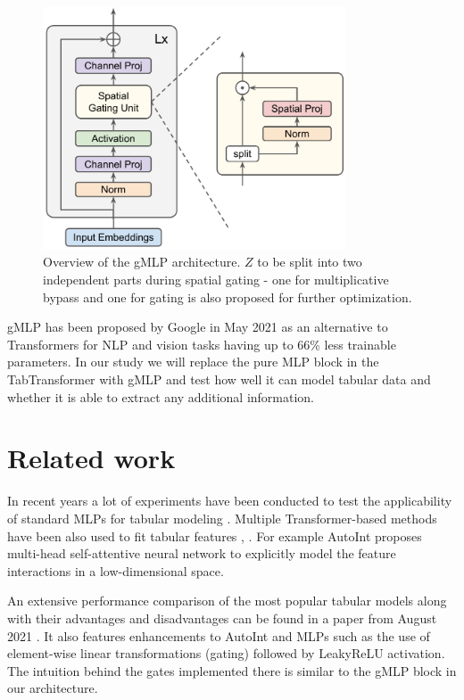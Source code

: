 \documentclass{article}
\begin{document}
\begin{figure}[hpt]
    \begin{center}
      \includegraphics[width=9cm]{gmlp-overview.pdf}
      \caption{Overview of the gMLP architecture. $Z$ to be split into two independent parts during spatial gating - one for multiplicative bypass and one for gating is also proposed for further optimization.}
    \end{center}

    \label{fig:gmlp-overview}
\end{figure}

gMLP has been proposed by Google in May 2021 as an alternative to Transformers for NLP and vision tasks having up to 66\% less trainable parameters. In our study we will replace the pure MLP block in the TabTransformer with gMLP and test how well it can model tabular data and whether it is able to extract any additional information.

\section{Related work}

In recent years a lot of experiments have been conducted to test the applicability of standard MLPs for tabular modeling \cite{de2015deep}. Multiple Transformer-based methods have been also used to fit tabular features  \cite{li2020interpretable}, \cite{sun2019deepenfm}. For example AutoInt \cite{li2020interpretable} proposes multi-head self-attentive neural network to explicitly model the feature interactions in a low-dimensional space.

An extensive performance comparison of the most popular tabular models along with their advantages and disadvantages can be found in a paper from August 2021 \cite{fiedler2021simple}. It also features enhancements to AutoInt and MLPs such as the use of element-wise linear transformations (gating) followed by LeakyReLU activation. The intuition behind the gates implemented there is similar to the gMLP block in our architecture.
\end{document}
